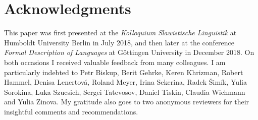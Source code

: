 \documentclass[output=paper,
colorlinks,
citecolor=brown,
newtxmath
]{langscibook}
\begin{document}

\section*{Acknowledgments}\largerpage

This paper was first presented at the \textit{Kolloquium Slawistische Linguistik} at Humboldt University Berlin in July 2018, and then later at the conference \textit{Formal Description of  Languages} at Göttingen University in December 2018. On both occasions I received valuable feedback from many colleagues. I am particularly indebted to Petr Biskup, Berit Gehrke, Keren Khrizman, Robert Hammel, Denisa Lenertová, Roland Meyer, Irina Sekerina, Radek Šimík, Yulia Sorokina, Luka Szucsich, Sergei Tatevosov, Daniel Tiskin, Claudia Wichmann and Yulia Zinova. My gratitude also goes to two anonymous reviewers for their insightful comments and recommendations.

{\sloppy\printbibliography[heading=subbibliography,notkeyword=this]}
\end{document}
